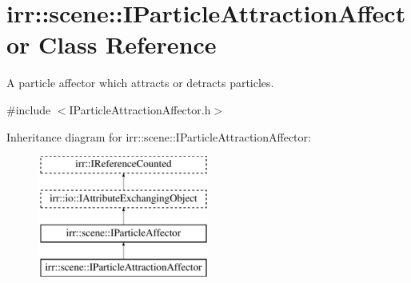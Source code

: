 \hypertarget{classirr_1_1scene_1_1IParticleAttractionAffector}{}\section{irr\+:\+:scene\+:\+:I\+Particle\+Attraction\+Affector Class Reference}
\label{classirr_1_1scene_1_1IParticleAttractionAffector}


A particle affector which attracts or detracts particles.  




{\ttfamily \#include $<$I\+Particle\+Attraction\+Affector.\+h$>$}

Inheritance diagram for irr\+:\+:scene\+:\+:I\+Particle\+Attraction\+Affector\+:\begin{figure}[H]
\begin{center}
\leavevmode
\includegraphics[height=4.000000cm]{classirr_1_1scene_1_1IParticleAttractionAffector}
\end{center}
\end{figure}
